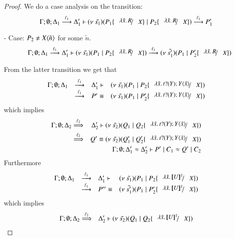 \begin{proof}
	\noi We do a case analysis on the transition:
%
	\[
		\Gamma; \es; \Delta_1 \by{\ell_1} \Delta_1' \proves \newsp{\tilde{s_1}}{P_1 \subst{\abs{\tilde{x}}{R}}{X} \Par P_2\subst{\abs{\tilde{x}}{R}}{X} } \by{\ell_1} P_1'
	\]
%

	\noi - Case: $P_2 \not= X\langle \tilde{n} \rangle$ for some $\tilde{n}$.
%
	\begin{eqnarray*}
		&&\Gamma; \es; \Delta_1 \by{\ell_1} \Delta_1' \proves \newsp{\tilde{s_1}}{P_1 \Par P_2 \subst{\abs{\tilde{x}}{R}}{X} }
		\by{\ell_1}
		\newsp{\tilde{s_1'}}{P_1 \Par P_2' \subst{\abs{\tilde{x}}{R}}{X}}
	\end{eqnarray*}

	\noi From the latter transition we get that
%
\[
	\begin{array}{rcll}
		\Gamma; \es; \Delta_1 &\by{\ell_1}& \Delta_1' \proves & \newsp{\tilde{s_1}}{P_1 \Par P_2 \subst{\abs{\tilde{x}}{\binp{t}{Y} \appl{Y}{\tilde{x}}}}{X}}\\
		&\by{\ell_1}&
		P' \scong & \newsp{\tilde{s_1}}{P_1 \Par P_2' \subst{\abs{\tilde{x}}{\binp{t}{Y} \appl{Y}{\tilde{x}}}}{X}}
	\end{array}
\]
%
	\noi which implies
%
	\begin{eqnarray}
		\Gamma; \es; \Delta_2 &\By{\ell_2}& \Delta_2' \proves \newsp{\tilde{s_2}}{Q_1 \Par Q_2 \subst{\abs{\tilde{x}}{\binp{t}{Y} \appl{Y}{\tilde{x}}}}{X}} \nonumber \\
		&\By{\ell_2}&
		Q' \scong \newsp{\tilde{s_2}}{Q_1' \Par Q_2' \subst{\abs{\tilde{x}}{\binp{t}{Y} \appl{Y}{\tilde{x}}}}{X}} \label{lem:subst_equiv1}
		\\
		&&\Gamma; \es; \Delta_1' \wb \Delta_2' \proves P' \Par C_1 \wb Q' \Par C_2 \label{lem:subst_equiv2}
	\end{eqnarray}
%
	\noi Furthermore
%
\[
	\begin{array}{rcll}
		\Gamma; \es; \Delta_1 &\by{\ell_1}& \Delta_1' \proves & \newsp{\tilde{s_1}}{P_1 \Par P_2 \subst{\abs{\tilde{x}}{\map{U}^{\tilde{x}}}}{X}}\\
		&\by{\ell_1}&
		P'' \scong & \newsp{\tilde{s_1'}}{P_1 \Par P_2' \subst{\abs{\tilde{x}}{\map{U}^{\tilde{x}}}}{X}}
	\end{array}
\]
%
	\noi which implies
%
	\begin{eqnarray}
		\Gamma; \es; \Delta_2 &\By{\ell_2}& \Delta_2' \proves \newsp{\tilde{s_2}}{Q_1 \Par Q_2 \subst{\abs{\tilde{x}}{\map{U}^{\tilde{x}}}}{X}} \nonumber \\

\end{eqnarray}
\end{proof}
